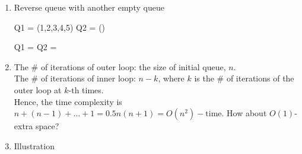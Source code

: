 \documentclass[12pt]{article}
\begin{document}
\begin{enumerate}
  \item
    Reverse queue with another empty queue\par
    \begin{minipage}{.7\linewidth}
    \begin{algorithm}[H]

        Q1 = \KwInitQueue(1,2,3,4,5)\;
        Q2 = \KwInitQueue()\;

        {
          {
               Q1 = \;
          }
          Q2 = \;
        }
    \end{algorithm}
    \end{minipage}
  \item 
    The \# of iterations of outer loop: the size of initial queue, $n$.\\
    The \# of iterations of inner loop: $n-k$, where $k$ is the \# of iterations of the outer loop at $k\text{-th}$ times.\\
    Hence, the time complexity is $n+(n-1)+\dots+1=0.5n(n+1)=O(n^2)-\text{time}$.
    How about $O(1)$-extra space?
  \item Illustration\par 



\begin{tikzpicture}[x=0.75pt,y=0.75pt,yscale=-1,xscale=1]


\end{tikzpicture}
\end{enumerate}
\end{document}
